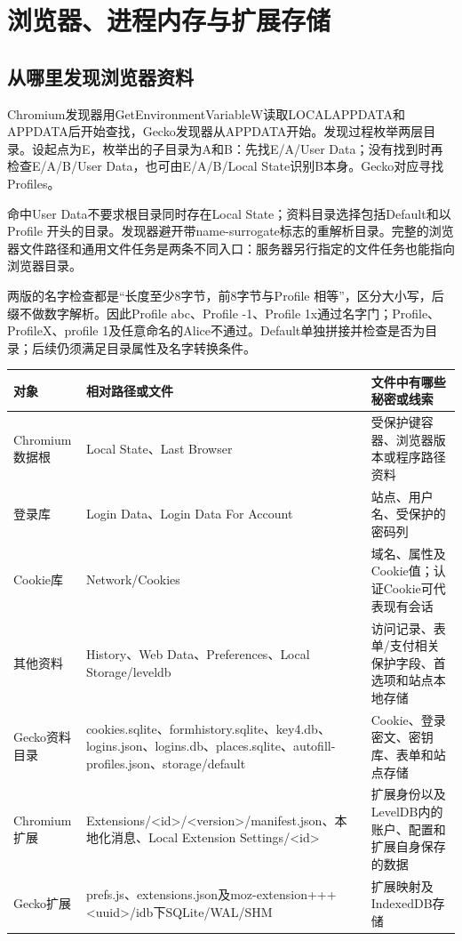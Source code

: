 \documentclass[UTF8,a4paper,zihao=5,fontset=windows]{ctexart}
\newcommand{\code}[1]{{\ttfamily\small #1}}
\begin{document}
\section{浏览器、进程内存与扩展存储}
\label{sec:browser}
\subsection{从哪里发现浏览器资料}
Chromium发现器用\code{GetEnvironmentVariableW}读取\code{LOCALAPPDATA}和\code{APPDATA}后开始查找，Gecko发现器从\code{APPDATA}开始。发现过程枚举两层目录。设起点为E，枚举出的子目录为A和B：先找\code{E/A/User Data}；没有找到时再检查\code{E/A/B/User Data}，也可由\code{E/A/B/Local State}识别B本身。Gecko对应寻找\code{Profiles}。

命中\code{User Data}不要求根目录同时存在\code{Local State}；资料目录选择包括\code{Default}和以\code{Profile }开头的目录。发现器避开带name-surrogate标志的重解析目录。完整的浏览器文件路径和通用文件任务是两条不同入口：服务器另行指定的文件任务也能指向浏览器目录。

两版的名字检查都是“长度至少8字节，前8字节与\code{Profile }相等”，区分大小写，后缀不做数字解析。因此\code{Profile abc}、\code{Profile -1}、\code{Profile 1x}通过名字门；\code{Profile}、\code{ProfileX}、\code{profile 1}及任意命名的\code{Alice}不通过。\code{Default}单独拼接并检查是否为目录；后续仍须满足目录属性及名字转换条件。

\begin{longtable}{@{}L{31mm}L{70mm}L{49mm}@{}}\toprule 对象 & 相对路径或文件 & 文件中有哪些秘密或线索\\\midrule\endhead
Chromium数据根 & \code{Local State}、\code{Last Browser} & 受保护键容器、浏览器版本或程序路径资料\\
登录库 & \code{Login Data}、\code{Login Data For Account} & 站点、用户名、受保护的密码列\\
Cookie库 & \code{Network/Cookies} & 域名、属性及Cookie值；认证Cookie可代表现有会话\\
其他资料 & \code{History}、\code{Web Data}、\code{Preferences}、\code{Local Storage/leveldb} & 访问记录、表单/支付相关保护字段、首选项和站点本地存储\\
Gecko资料目录 & \code{cookies.sqlite}、\code{formhistory.sqlite}、\code{key4.db}、\code{logins.json}、\code{logins.db}、\code{places.sqlite}、\code{autofill-profiles.json}、\code{storage/default} & Cookie、登录密文、密钥库、表单和站点存储\\
Chromium扩展 & \code{Extensions/<id>/<version>/manifest.json}、本地化消息、\code{Local Extension Settings/<id>} & 扩展身份以及LevelDB内的账户、配置和扩展自身保存的数据\\
Gecko扩展 & \code{prefs.js}、\code{extensions.json}及\code{moz-extension+++<uuid>/idb}下SQLite/WAL/SHM & 扩展映射及IndexedDB存储\\\bottomrule\end{longtable}
\end{document}
